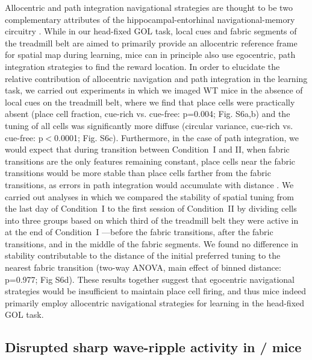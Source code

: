 Allocentric and path integration navigational strategies are thought to be two complementary attributes of the hippocampal-entorhinal navigational-memory circuitry \citep{Buzsaki2013}\citep{Etienne2004}\citep{Gothard1996}\citep{Moser2015}. While in our head-fixed GOL task, local cues and fabric segments of the treadmill belt are aimed to primarily provide an allocentric reference frame for spatial map during learning, mice can in principle also use egocentric, path integration strategies to find the reward location. In order to elucidate the relative contribution of allocentric navigation and path integration in the learning task, we carried out experiments in which we imaged WT mice in the absence of local cues on the treadmill belt, where we find that place cells were practically absent (place cell fraction, cue-rich vs. cue-free: p=0.004; Fig. S6a,b) and the tuning of all cells was significantly more diffuse (circular variance, cue-rich vs. cue-free: p$<$0.0001; Fig. S6c). Furthermore, in the case of path integration, we would expect that during transition between Condition~I and II, when fabric transitions are the only features remaining constant, place cells near the fabric transitions would be more stable than place cells farther from the fabric transitions, as errors in path integration would accumulate with distance \citep{Etienne2004}\citep{Gothard1996}. We carried out analyses in which we compared the stability of spatial tuning from the last day of Condition~I to the first session of Condition~II by dividing cells into three groups based on which third of the treadmill belt they were active in at the end of Condition~I —before the fabric transitions, after the fabric transitions, and in the middle of the fabric segments. We found no difference in stability contributable to the distance of the initial preferred tuning to the nearest fabric transition (two-way ANOVA, main effect of binned distance: p=0.977; Fig S6d). These results together suggest that egocentric navigational strategies would be insufficient to maintain place cell firing, and thus mice indeed primarily employ allocentric navigational strategies for learning in the head-fixed GOL task.

\subsection{Disrupted sharp wave-ripple activity in \df/ mice}

